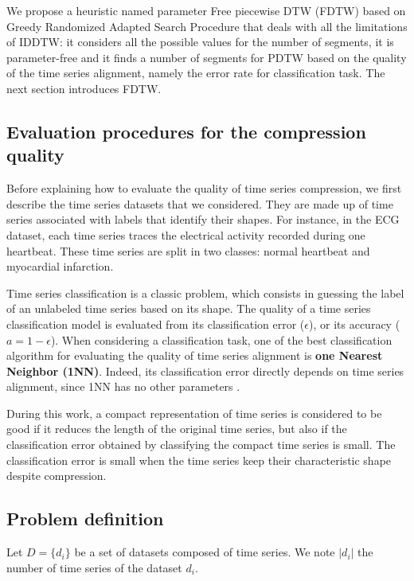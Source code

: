 We propose a  heuristic named parameter Free piecewise DTW (FDTW) \cite{siyouRairo} based on Greedy Randomized Adapted Search Procedure that deals with all the limitations of IDDTW: it considers all the possible values for the number of segments, it is parameter-free and it finds a number of segments for PDTW based on the quality of  the time series alignment, namely the error rate for classification task. The next section introduces FDTW.

\subsection{ Evaluation procedures for the compression quality}
Before explaining how to evaluate the quality of time series compression, we
first describe the time series datasets that we considered. They are
made up of time series associated with labels that identify their shapes. For instance, in the ECG dataset, each time series traces the
electrical activity recorded during one heartbeat. These time series are split in two classes: normal heartbeat and myocardial infarction. 

 Time series classification is a classic problem, which consists in guessing the label of an unlabeled time series  based on its shape.
The quality of a time series classification model is evaluated from its classification error ($\epsilon$), or its accuracy ($a = 1 - \epsilon$).  When considering a classification task, one of the
best classification algorithm  for evaluating the quality of time series
alignment is \textbf{one Nearest Neighbor (1NN)}. Indeed,  its classification
error directly depends on time series alignment, since 1NN has no other parameters \cite{wang2013experimental}.

During this work, a compact representation of time series  is considered to be good
if it reduces the length of the original time series, but also if the classification error
obtained by classifying the compact time series is small. The classification error is small
when the time series keep their characteristic shape despite compression.   



\subsection{Problem definition}

Let $D = \{d_i\}$ be a set of datasets composed of time series. We note
$|d_i|$ the number of time series of the dataset $d_i$.

